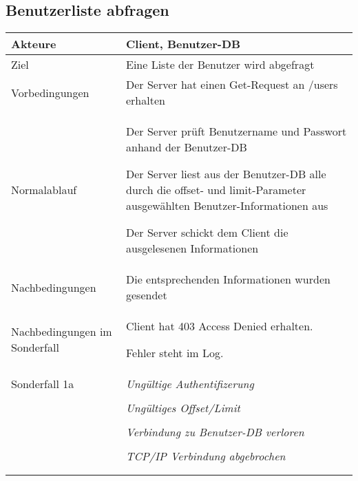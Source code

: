 \documentclass[a4paper,10pt,titlepage,parskip=true]{article}
\makeatletter
\newcommand\novspace{\@minipagetrue}
\newenvironment{owncompactitem}{%
\compactitem
}{%
\@finalstrut\@arstrutbox
\@nameuse{endcompactitem}%
\aftergroup\let\aftergroup\@finalstrut\aftergroup\@gobble
}
\newenvironment{owncompactenum}{%
\compactenum
}{%
\@finalstrut\@arstrutbox
\@nameuse{endcompactenum}%
\aftergroup\let\aftergroup\@finalstrut\aftergroup\@gobble
}
\newcommand{\usecase}[7]
{\subsection{#1}
\setlength{\extrarowheight}{2pt}
\begin{tabular}{|p{0.2\textwidth}|p{0.9\textwidth}|}
\hline
  Akteure & #2\\\hline
  Ziel & #3\\\hline
  Vorbedingungen & \novspace
  	\begin{owncompactitem}[-] #4 \end{owncompactitem} \\\hline
  Normalablauf & \vspace{-7pt}
  	\begin{owncompactenum}[1.] #6 \end{owncompactenum} \\\hline
  Nachbedingungen & \novspace
  	\begin{owncompactitem}[-] #5 \end{owncompactitem} \\\hline
  #7
\end{tabular}
}
\newcommand{\sonderfall}[4][\empty]
{
Sonderfall #2 & \vspace{-10pt}
	\textit{#3}
	\begin{owncompactenum}[{#2}.1] {#4} \end{owncompactenum}
  	\ifthenelse{\equal{#1}{\empty}}
    	{\\\hline} %
    	{\ensuremath{\rightarrow} #1 \\ [+1pt] \hline} %

}
\newcommand{\sondernachbedingung}[1]
{
Nachbedingungen im Sonderfall& \novspace
	\begin{owncompactitem}[-]
		#1
	\end{owncompactitem} \\\hline
}
\makeatother
\begin{document}
\usecase{Benutzerliste abfragen}{Client, Benutzer-DB}%
{Eine Liste der Benutzer wird abgefragt}%
{%
  \item Der Server hat einen Get-Request an /users erhalten
}
{%
  \item Die entsprechenden Informationen wurden gesendet
}
{%
  \item Der Server prüft Benutzername und Passwort anhand der Benutzer-DB
  \item Der Server liest aus der Benutzer-DB alle durch die offset- und limit-Parameter ausgewählten Benutzer-Informationen aus
  \item Der Server schickt dem Client die ausgelesenen Informationen
}
{%
  \sondernachbedingung{
	\item Client hat 403 Access Denied erhalten.
	\item Fehler steht im Log.
	}
		\sonderfall[Weiter mit normalem Betrieb]{1a}
    {Ungültige Authentifizerung}
    {
    \item Fehler wird ins Log geschrieben
  	\item Der Client erhält eine entsprechende Fehlermeldung mit HTTP-Status 403 Access Denied
    }

	\sonderfall[Weiter mit normalem Betrieb]{2a}%
	{Ungültiges Offset/Limit}%
  	{
	\item Der Fehler wird ins Log geschrieben
	\item Der Client erhält eine entsprechende Fehlermeldung
  	}
  	    
	\sonderfall[Kritischer Fehler, Server ist beendet]{*}%
	{Verbindung zu Benutzer-DB verloren}%
  	{
	\item Der Fehler wird ins Log geschrieben (als schwerwiegender Fehler)
	\item Der Client erhält eine entsprechende Fehlermeldung
	\item Der Server wird beendet
  	}

\sonderfall[Weiter mit normalem Betrieb]{**}%
	{TCP/IP Verbindung abgebrochen}%
	{
	\item Fehlermeldung wird ins Log geschrieben
	}
}
\end{document}
